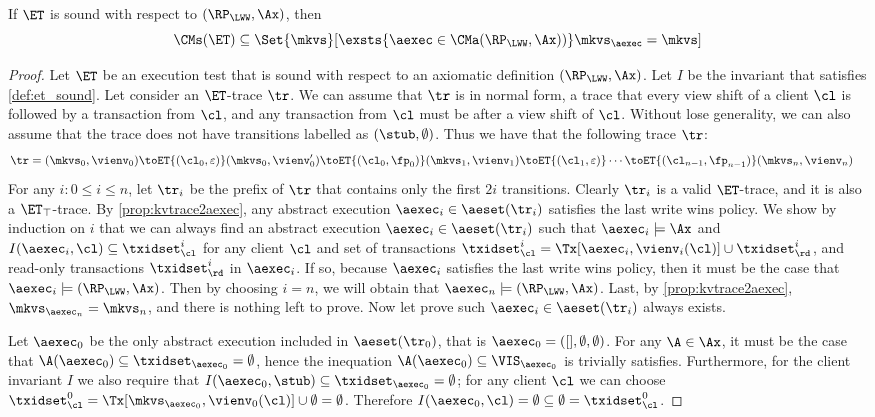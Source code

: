 \begin{theorem}[Soundness]
\label{thm:et_soundness}
If \(\ET\) is sound with respect to \((\RP_{\LWW}, \Ax)\), then 
\[
    \CMs(\ET) \subseteq \Set{ \mkvs }[ \exsts{ \aexec \in \CMa(\RP_{\LWW}, \Ax)) }\mkvs_{\aexec} = \mkvs]
\]
\end{theorem}
\begin{proof}
Let \(\ET\) be an execution test that is sound with respect to an 
axiomatic definition \((\RP_{\LWW}, \Ax)\). Let \(I\) be 
the invariant that satisfies \cref{def:et_sound}. 
Let consider an \(\ET\)-trace \(\tr\).
We can assume that \(\tr\) is in normal form, 
a trace that every view shift of a client \( \cl \) is followed by a transaction from \( \cl \),
and any transaction from \( \cl \) must be after a view shift of \( \cl \).
Without lose generality, we can also assume that the trace does not have transitions labelled as \((\stub, \emptyset)\).
Thus we have that the following trace \( \tr \):
\begin{align*}
\tr & =  (\mkvs_{0}, \vienv_{0}) \toET{(\cl_{0}, \varepsilon)} (\mkvs_{0}, \vienv_{0}') 
\toET{(\cl_{0}, \fp_{0})} 
(\mkvs_1, \vienv_{1}) \toET{(\cl_1, \varepsilon)}  \cdots
\toET{(\cl_{n-1}, \fp_{n-1})} (\mkvs_{n}, \vienv_{n})
\end{align*}
For any \(i : 0 \leq i \leq n\), let \(\tr_{i}\) be the prefix of \(\tr\) that 
contains only the first \(2i\) transitions. 
Clearly \(\tr_{i}\) is a valid \(\ET\)-trace, and it is also a \(\ET_{\top}\)-trace. 
By \cref{prop:kvtrace2aexec}, 
any abstract execution \(\aexec_{i} \in \aeset(\tr_{i})\) satisfies the last write wins policy. 
We show by induction on \(i\) that we can always find 
an abstract execution \(\aexec_{i} \in \aeset(\tr_{i})\) such that \(\aexec_i \models \Ax\) and \(I(\aexec_{i}, \cl) \subseteq \txidset^{i}_{\cl}\)
for any client \(\cl\) and set of transactions 
\(\txidset^{i}_{\cl} = \Tx[\aexec_{i}, \vienv_{i}(\cl)] \cup \txidset^{i}_\rd\), 
and read-only transactions \(\txidset_\rd^{i}\) in \(\aexec_{i}\).
If so, because \(\aexec_{i}\) satisfies the last write wins policy,
then it must be the case that \(\aexec_{i} \models (\RP_{\LWW}, \Ax)\). 
Then by choosing \(i = n\), we will obtain that \(\aexec_{n} \models (\RP_{\LWW}, \Ax)\). 
Last, by \cref{prop:kvtrace2aexec}, \(\mkvs_{\aexec_{n}} = \mkvs_{n}\), and there is nothing left to prove.
Now let prove such \(\aexec_{i} \in \aeset(\tr_{i})\) always exists.

Let \(\aexec_{0}\) be the only abstract execution included in \(\aeset(\tr_{0})\), 
that is \(\aexec_{0} = ([], \emptyset, \emptyset)\). 
For any \(\A \in \Ax\), it must be the case that 
\(\A(\aexec_{0}) \subseteq \txidset_{\aexec_{0}} = \emptyset\), 
hence the inequation \(\A(\aexec_{0}) \subseteq \VIS_{\aexec_{0}}\) is trivially satisfies.
Furthermore, for the client invariant \(I\) we also require that \(I(\aexec_{0}, \stub) \subseteq \txidset_{\aexec_{0}} = \emptyset\); 
for any client \(\cl\) we can choose \(\txidset_{\cl}^{0} = \Tx[\mkvs_{\aexec_{0}},\vienv_{0}(\cl)] \cup \emptyset = \emptyset\). 
Therefore \(I(\aexec_{0}, \cl) = \emptyset \subseteq \emptyset = \txidset_{\cl}^{0}\).


\end{proof}
